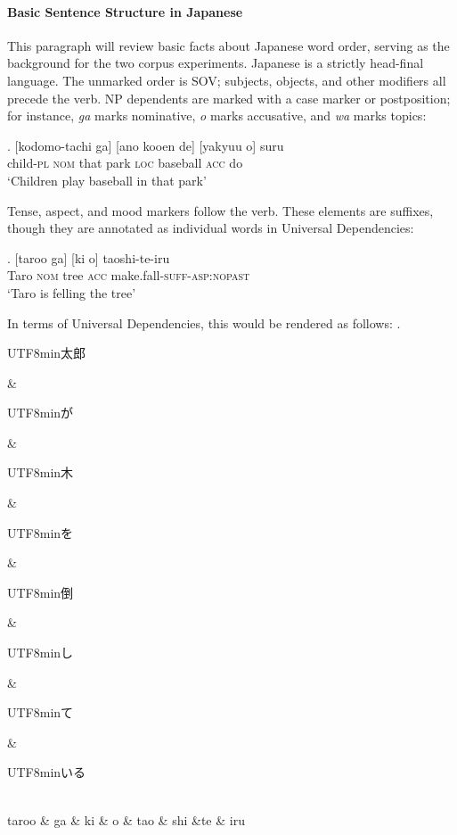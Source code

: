 \documentclass[11pt,a4paper]{article}
\newcommand{\japanese}[1]{\begin{CJK}{UTF8}{min}#1\end{CJK}}
\begin{document}
\paragraph{Basic Sentence Structure in Japanese}
This paragraph will review basic facts about Japanese word order, serving as the background for the two corpus experiments.
Japanese is a strictly head-final language. The unmarked order is SOV; subjects, objects, and other modifiers all precede the verb.
NP dependents are marked with a case marker or postposition; for instance, \emph{ga} marks nominative, \emph{o} marks accusative, and \emph{wa} marks topics:


\exg. [kodomo-tachi ga] [ano kooen de] [yakyuu o] suru \\
child-\textsc{pl} \textsc{nom} that park \textsc{loc} baseball \textsc{acc} do \\
`Children play baseball in that park' \citep[p. 118]{iwasaki2013japanese}

Tense, aspect, and mood markers follow the verb.
These elements are suffixes, though they are annotated as individual words in Universal Dependencies:

\exg. [taroo ga] [ki o] taoshi-te-iru \\
Taro \textsc{nom} tree \textsc{acc} make.fall-\textsc{suff}-\textsc{asp:nopast} \\
`Taro is felling the tree' \citep[p. 138]{iwasaki2013japanese} \label{ex:taro-tree}

In terms of Universal Dependencies, this would be rendered as follows:
\ex.
\begin{dependency}[theme = simple]
   \begin{deptext}[column sep=1em]
          \japanese{太郎} \& \japanese{が} \& \japanese{木} \& \japanese{を} \& \japanese{倒} \& \japanese{し} \& \japanese{て} \& \japanese{いる} \\
          taroo \& ga \& ki \& o \& tao \& shi \&te \& iru \\ 
   \end{deptext}
\end{dependency}\label{ex:taro-tree-tree}
\end{document}
